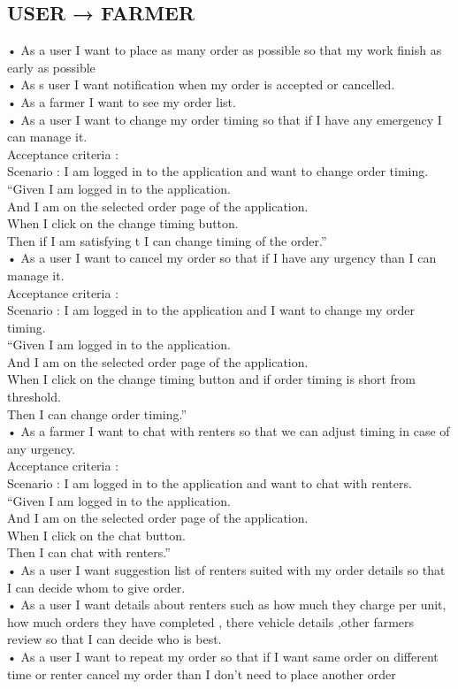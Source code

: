 \documentclass[conference]{IEEEtran}
\begin{document}
\subsection{USER → FARMER}
• As a user I want to place as many order as possible so that my work finish as early as possible \\
• As s user I want notification when my order is accepted or cancelled.\\
• As a farmer I want to see my order list.\\
• As a user I want to change my order timing so that if I have any emergency I can manage it.\\
 Acceptance criteria : \\
Scenario : I am logged in to the application and want to change order timing.\\
“Given I am logged in to the application.\\
And I am on the selected order page of the application.\\
When I click on the change timing button.\\
Then if I am satisfying t I can change timing of the order.”\\
• As a user I want to cancel my order so that if I have any urgency than I can manage it.\\
 Acceptance criteria : \\
 Scenario : I am logged in to the application and I want to change my 
order timing.\\
“Given I am logged in to the application.\\
And I am on the selected order page of the application.\\
When I click on the change timing button and if order timing is short 
from threshold.\\
Then I can change order timing.”\\
• As a farmer I want to chat with renters so that we can adjust timing in case of any urgency.\\
 Acceptance criteria : \\
 Scenario : I am logged in to the application and want to chat with 
renters.\\
“Given I am logged in to the application.\\
And I am on the selected order page of the application.\\
When I click on the chat button.\\
Then I can chat with renters.”\\
• As a user I want suggestion list of renters suited with my order details so that I can decide whom to give order.\\
• As a user I want details about renters such as how much they charge per unit, how much orders they have completed , there vehicle details ,other farmers review so that I can decide who is best.\\
• As a user I want to repeat my order so that if I want same order on different time or renter cancel my order than I don’t need to place another order\\
\end{document}
